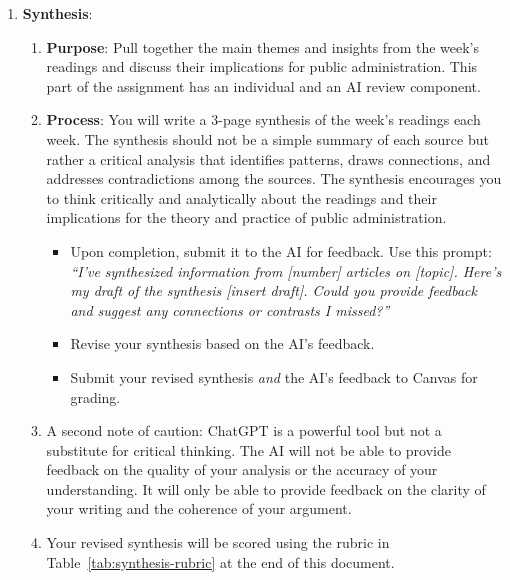 \documentclass[12pt, letterpaper]{article}
\begin{document}
\begin{enumerate}
\item \textbf{Synthesis}:

\begin{enumerate}
    \item \textbf{Purpose}: Pull together the main themes and insights from the week’s readings and discuss their implications for public administration. This part of the assignment has an individual and an AI review component.
    \item \textbf{Process}: You will write a 3-page synthesis of the week's readings each week. The synthesis should not be a simple summary of each source but rather a critical analysis that identifies patterns, draws connections, and addresses contradictions among the sources. The synthesis encourages you to think critically and analytically about the readings and their implications for the theory and practice of public administration.
        \begin{itemize}
            \item Upon completion, submit it to the AI for feedback. Use this prompt:  \textit{“I’ve synthesized information from [number] articles on [topic]. Here’s my draft of the synthesis [insert draft]. Could you provide feedback and suggest any connections or contrasts I missed?”}
            \item Revise your synthesis based on the AI's feedback.
            \item Submit your revised synthesis \emph{and} the AI's feedback to Canvas for grading.
        \end{itemize}
    \item A second note of caution: ChatGPT is a powerful tool but not a substitute for critical thinking. The AI will not be able to provide feedback on the quality of your analysis or the accuracy of your understanding. It will only be able to provide feedback on the clarity of your writing and the coherence of your argument.    
    \item Your revised synthesis will be scored using the rubric in Table~\ref{tab:synthesis-rubric} at the end of this document. 
\end{enumerate}


\end{enumerate}
\end{document}
